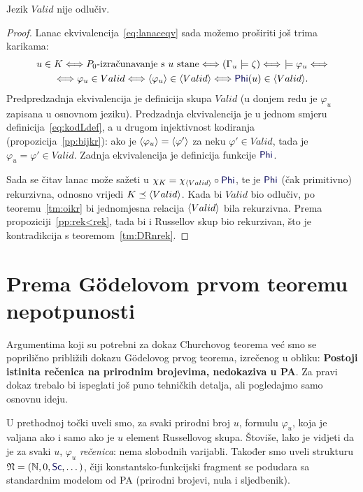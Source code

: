 \begin{propozicija}
Jezik $Valid$ nije odlučiv.
\end{propozicija}
\begin{proof}
Lanac ekvivalencija~\eqref{eq:lanaceqv} sada možemo proširiti još trima karikama:
\begin{multline}
    u\in K
    \Longleftrightarrow
    \text{$P_0$-izračunavanje s $u$ stane}
    \Longleftrightarrow
    (\Gamma_u\models\zeta)
    \Longleftrightarrow{}\!
    \models\varphi_u
    \Longleftrightarrow\\
    \Longleftrightarrow
    \varphi_u\in Valid
    \Longleftrightarrow
    \kr{\varphi_u}\in\kr{Valid}
    \Longleftrightarrow
    \f{Phi}(u)\in\kr{Valid}
    \text.
\end{multline}
Predpredzadnja ekvivalencija je definicija skupa $Valid$ (u donjem redu je $\varphi_u$ zapisana u osnovnom jeziku). Predzadnja ekvivalencija je u jednom smjeru definicija~\eqref{eq:kodLdef}, a u drugom injektivnost kodiranja (propozicija~\ref{pp:bijkr}): ako je $\langle\varphi_u\rangle=\langle\varphi'\rangle$ za neku $\varphi'\in Valid$, tada je $\varphi_u=\varphi'\in Valid$. Zadnja ekvivalencija je definicija funkcije $\f{Phi}$.

Sada se čitav lanac može sažeti u $\chi_{K}=\chi_{\kr{Valid}}\circ\f{Phi}$, te je $\f{Phi}$ (čak primitivno) rekurzivna, odnosno vrijedi $K\preceq\langle Valid\rangle$. 
Kada bi $Valid$ bio odlučiv, po teoremu~\ref{tm:oikr} bi jednomjesna relacija $\langle Valid\rangle$ bila rekurzivna. Prema propoziciji~\ref{pp:rek<rek}, tada bi i Russellov skup bio rekurzivan, što je kontradikcija s teoremom~\ref{tm:DRnrek}.
\end{proof}

\section{Prema G\"odelovom prvom teoremu nepotpunosti}

Argumentima koji su potrebni za dokaz Churchovog teorema već smo se poprilično približili dokazu G\"odelovog prvog teorema, izrečenog u obliku: \textbf{Postoji istinita rečenica na prirodnim brojevima, nedokaziva u PA}. Za pravi dokaz trebalo bi ispeglati još puno tehničkih detalja, ali pogledajmo samo osnovnu ideju.

U prethodnoj točki uveli smo, za svaki prirodni broj $u$, formulu $\varphi_u$, koja je valjana ako i samo ako je $u$ element Russellovog skupa. Štoviše, lako je vidjeti da je za svaki $u$, $\varphi_u$ \emph{rečenica}: nema slobodnih varijabli. Također smo uveli strukturu $\mathfrak N=(\N,0,\f{Sc},\dotsc)$, čiji konstantsko-funkcijski fragment se podudara sa standardnim modelom od PA (prirodni brojevi, nula i sljedbenik).

